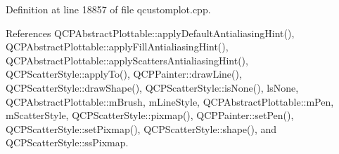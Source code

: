 Definition at line 18857 of file qcustomplot.\+cpp.



References Q\+C\+P\+Abstract\+Plottable\+::apply\+Default\+Antialiasing\+Hint(), Q\+C\+P\+Abstract\+Plottable\+::apply\+Fill\+Antialiasing\+Hint(), Q\+C\+P\+Abstract\+Plottable\+::apply\+Scatters\+Antialiasing\+Hint(), Q\+C\+P\+Scatter\+Style\+::apply\+To(), Q\+C\+P\+Painter\+::draw\+Line(), Q\+C\+P\+Scatter\+Style\+::draw\+Shape(), Q\+C\+P\+Scatter\+Style\+::is\+None(), ls\+None, Q\+C\+P\+Abstract\+Plottable\+::m\+Brush, m\+Line\+Style, Q\+C\+P\+Abstract\+Plottable\+::m\+Pen, m\+Scatter\+Style, Q\+C\+P\+Scatter\+Style\+::pixmap(), Q\+C\+P\+Painter\+::set\+Pen(), Q\+C\+P\+Scatter\+Style\+::set\+Pixmap(), Q\+C\+P\+Scatter\+Style\+::shape(), and Q\+C\+P\+Scatter\+Style\+::ss\+Pixmap.


